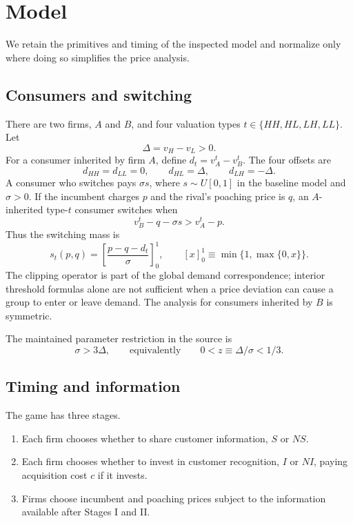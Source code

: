 \section{Model}\label{sec:model}

We retain the primitives and timing of the inspected model and normalize only where doing so simplifies the price analysis.

\subsection{Consumers and switching}

There are two firms, \(A\) and \(B\), and four valuation types \(t\in\{HH,HL,LH,LL\}\). Let
\[
\Delta=v_H-v_L>0.
\]
For a consumer inherited by firm \(A\), define \(d_t=v_A^t-v_B^t\). The four offsets are
\[
d_{HH}=d_{LL}=0,\qquad d_{HL}=\Delta,\qquad d_{LH}=-\Delta.
\]
A consumer who switches pays \(\sigma s\), where \(s\sim U[0,1]\) in the baseline model and \(\sigma>0\). If the incumbent charges \(p\) and the rival's poaching price is \(q\), an \(A\)-inherited type-\(t\) consumer switches when
\[
v_B^t-q-\sigma s>v_A^t-p.
\]
Thus the switching mass is
\[
s_t(p,q)=
\left[\frac{p-q-d_t}{\sigma}\right]_0^1,
\qquad
[x]_0^1\equiv\min\{1,\max\{0,x\}\}.
\]
The clipping operator is part of the global demand correspondence; interior threshold formulas alone are not sufficient when a price deviation can cause a group to enter or leave demand. The analysis for consumers inherited by \(B\) is symmetric.

The maintained parameter restriction in the source is
\[
\sigma>3\Delta,
\qquad\text{equivalently}\qquad
0<z\equiv\Delta/\sigma<1/3.
\]

\subsection{Timing and information}

The game has three stages.

\begin{enumerate}
\item Each firm chooses whether to share customer information, \(S\) or \(NS\).
\item Each firm chooses whether to invest in customer recognition, \(I\) or \(NI\), paying acquisition cost \(c\) if it invests.
\item Firms choose incumbent and poaching prices subject to the information available after Stages I and II.
\end{enumerate}

